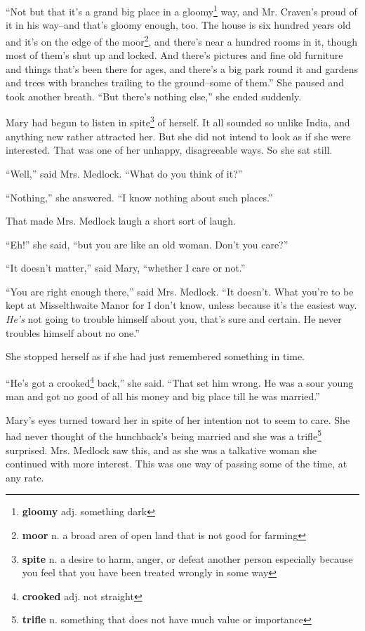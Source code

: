 ``Not but that it's a grand big place in a gloomy\footnote{\textbf{gloomy} adj. something dark} way, and Mr. Craven's proud of it in his way--and that's gloomy enough, too. The house is six hundred years old and it's on the edge of the moor\footnote{\textbf{moor} n. a broad area of open land that is not good for farming}, and there's near a hundred rooms in it, though most of them's shut up and locked. And there's pictures and fine old furniture and things that's been there for ages, and there's a big park round it and gardens and trees with branches trailing to the ground--some of them.'' She paused and took another breath. ``But there's nothing else,'' she ended suddenly.

Mary had begun to listen in spite\footnote{\textbf{spite} n. a desire to harm, anger, or defeat another person especially because you feel that you have been treated wrongly in some way} of herself. It all sounded so unlike India, and anything new rather attracted her. But she did not intend to look as if she were interested. That was one of her unhappy, disagreeable ways. So she sat still.

``Well,'' said Mrs. Medlock. ``What do you think of it?''

``Nothing,'' she answered. ``I know nothing about such places.''

That made Mrs. Medlock laugh a short sort of laugh.

``Eh!'' she said, ``but you are like an old woman. Don't you care?''

``It doesn't matter,'' said Mary, ``whether I care or not.''

``You are right enough there,'' said Mrs. Medlock. ``It doesn't. What you're to be kept at Misselthwaite Manor for I don't know, unless because it's the easiest way. \textit{He's} not going to trouble himself about you, that's sure and certain. He never troubles himself about no one.''

She stopped herself as if she had just remembered something in time.

``He's got a crooked\footnote{\textbf{crooked} adj. not straight} back,'' she said. ``That set him wrong. He was a sour young man and got no good of all his money and big place till he was married.''

Mary's eyes turned toward her in spite of her intention not to seem to care. She had never thought of the hunchback's being married and she was a trifle\footnote{\textbf{trifle} n. something that does not have much value or importance} surprised. Mrs. Medlock saw this, and as she was a talkative woman she continued with more interest. This was one way of passing some of the time, at any rate.
